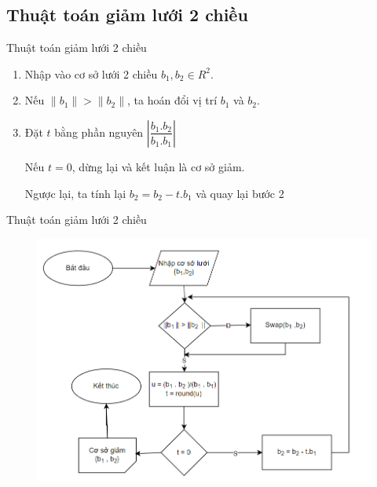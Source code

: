 \documentclass{beamer}
\numberwithin{equation}{section}
\begin{document}
\subsection{Thuật toán giảm lưới 2 chiều}
\begin{frame}{Thuật toán giảm lưới 2 chiều}

\begin{enumerate}
\item Nhập vào cơ sở lưới 2 chiều ${b_1, b_2} \in R^2$.
\item Nếu $\|b_1\| > \|b_2\|$, ta hoán đổi vị trí $b_1$ và $b_2$.
\item Đặt $t$ bằng phần nguyên $\left|\dfrac{b_1.b_2}{b_1.b_1}\right|$


Nếu $t = 0$, dừng lại và kết luận là cơ sở giảm.

Ngược lại, ta tính lại $b_2 = b_2 - t.b_1$ và quay lại bước 2
\end{enumerate}

\end{frame}
\begin{frame}{Thuật toán giảm lưới 2 chiều}

\begin{figure}[h]
\centering
\includegraphics[scale = 0.6]{pictures/thuat_toan_giam_luoi_2_chieu.png}
\end{figure}

\end{frame}
\end{document}
